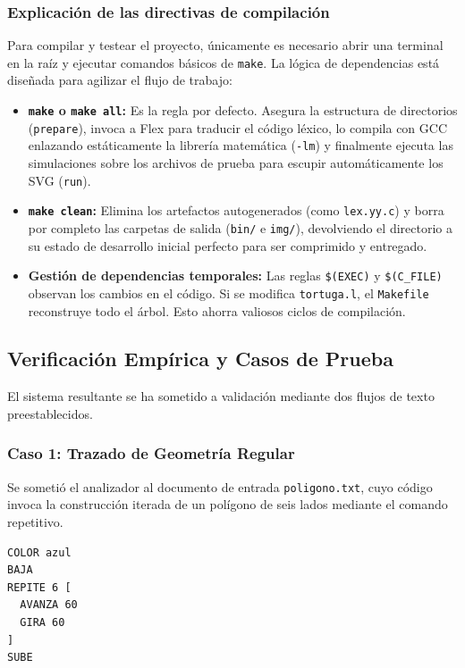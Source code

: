 \documentclass[12pt,a4paper]{article}
\begin{document}
\subsubsection{Explicación de las directivas de compilación}
Para compilar y testear el proyecto, únicamente es necesario abrir una terminal en la raíz y ejecutar comandos básicos de \texttt{make}. La lógica de dependencias está diseñada para agilizar el flujo de trabajo:
\begin{itemize}
    \item \textbf{\texttt{make} o \texttt{make all}:} Es la regla por defecto. Asegura la estructura de directorios (\texttt{prepare}), invoca a Flex para traducir el código léxico, lo compila con GCC enlazando estáticamente la librería matemática (\texttt{-lm}) y finalmente ejecuta las simulaciones sobre los archivos de prueba para escupir automáticamente los SVG (\texttt{run}).
    \item \textbf{\texttt{make clean}:} Elimina los artefactos autogenerados (como \texttt{lex.yy.c}) y borra por completo las carpetas de salida (\texttt{bin/} e \texttt{img/}), devolviendo el directorio a su estado de desarrollo inicial perfecto para ser comprimido y entregado.
    \item \textbf{Gestión de dependencias temporales:} Las reglas \texttt{\$(EXEC)} y \texttt{\$(C\_FILE)} observan los cambios en el código. Si se modifica \texttt{tortuga.l}, el \texttt{Makefile} reconstruye todo el árbol. Esto ahorra valiosos ciclos de compilación.
\end{itemize}

\newpage
\subsection{Verificación Empírica y Casos de Prueba}

El sistema resultante se ha sometido a validación mediante dos flujos de texto preestablecidos.

\subsubsection{Caso 1: Trazado de Geometría Regular}
Se sometió el analizador al documento de entrada \texttt{poligono.txt}, cuyo código invoca la construcción iterada de un polígono de seis lados mediante el comando repetitivo.

\begin{verbatim}
COLOR azul
BAJA
REPITE 6 [
  AVANZA 60
  GIRA 60
]
SUBE
\end{verbatim}
\end{document}
